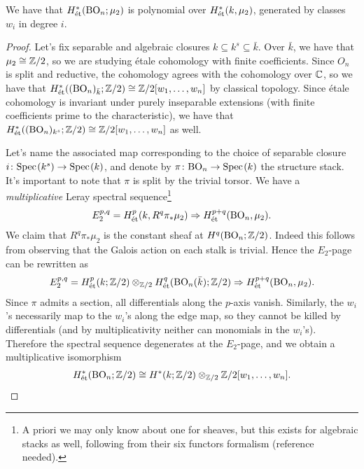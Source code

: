 \documentclass[11pt,openany]{book}
\begin{document}
\begin{theorem} We have that $H^\ast_{\text{\'{e}t}}(\mathrm{BO}_n;\mu_2)$ is polynomial over $H^\ast_{\text{\'{e}t}}(k,\mu_2)$, generated by classes $w_i$ in degree $i$.
\end{theorem}
\begin{proof} Let's fix separable and algebraic closures $k \subseteq k^s \subseteq \bar{k}$. Over $\bar{k}$, we have that $\mu_2\cong \mathbb{Z}/2$, so we are studying \'etale cohomology with finite coefficients. Since $O_n$ is split and reductive, the cohomology agrees with the cohomology over $\mathbb{C}$, so we have that $H^\ast_{\text{\'{e}t}}((\mathrm{BO}_n)_{\bar{k}}; \mathbb{Z}/2) \cong \mathbb{Z}/2[w_1, \ldots, w_n]$ by classical topology. Since \'etale cohomology is invariant under purely inseparable extensions (with finite coefficients prime to the characteristic), we have that $H^\ast_{\text{\'{e}t}}((\mathrm{BO}_n)_{k^s};\mathbb{Z}/2) \cong \mathbb{Z}/2[w_1, \ldots, w_n]$ as well.

Let's name the associated map corresponding to the choice of separable closure $i \colon \text{Spec}\hspace{0.1em}(k^s) \to \text{Spec}\hspace{0.1em}(k)$, and denote by $\pi \colon \mathrm{BO}_n \to \text{Spec}\hspace{0.1em}(k)$ the structure stack. It's important to note that $\pi$ is split by the trivial torsor. We have a \emph{multiplicative} Leray spectral sequence\footnote{A priori we may only know about one for sheaves, but this exists for algebraic stacks as well, following from their six functors formalism (reference needed).}
\begin{align*}
    E_2^{p,q} = H^p_{\text{\'{e}t}}(k,R^q \pi_\ast \mu_2) \Rightarrow H^{p+q}_{\text{\'{e}t}}(\mathrm{BO}_n,\mu_2).
\end{align*}
We claim that $R^q\pi_\ast \mu_2$ is the constant sheaf at $H^q(\mathrm{BO}_n;\mathbb{Z}/2)$. Indeed this follows from observing that the Galois action on each stalk is trivial. Hence the $E_2$-page can be rewritten as
\begin{align*}
    E_2^{p,q} = H^p_{\text{\'{e}t}}(k;\mathbb{Z}/2) \otimes_{\mathbb{Z}/2} H^q_{\text{\'{e}t}}(\mathrm{BO}_n(\bar{k});\mathbb{Z}/2) \Rightarrow H^{p+q}_{\text{\'{e}t}}(\mathrm{BO}_n,\mu_2).
\end{align*}
Since $\pi$ admits a section, all differentials along the $p$-axis vanish. Similarly, the $w_i$'s necessarily map to the $w_i$'s along the edge map, so they cannot be killed by differentials (and by multiplicativity neither can monomials in the $w_i$'s). Therefore the spectral sequence degenerates at the $E_2$-page, and we obtain a multiplicative isomorphism
\begin{align*}
    H^\ast_{\text{\'{e}t}}(\mathrm{BO}_n;\mathbb{Z}/2) \cong H^\ast(k;\mathbb{Z}/2) \otimes_{\mathbb{Z}/2}\mathbb{Z}/2[w_1, \ldots, w_n].
\end{align*}
\end{proof}
\end{document}
